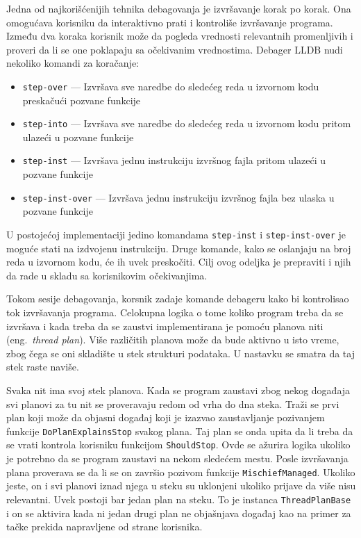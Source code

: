 \documentclass[12pt,oneside]{memoir}
\begin{document}
\label{sec:debugger_stepping}

Jedna od najkorišćenijih tehnika debagovanja je izvršavanje korak po korak.
Ona omogućava korisniku da interaktivno prati i kontroliše izvršavanje programa.
Između dva koraka korisnik može da pogleda vrednosti relevantnih promenljivih i proveri da li se one poklapaju sa očekivanim vrednostima.
Debager LLDB nudi nekoliko komandi za koračanje:
\begin{itemize}
  \item \verb|step-over| --- Izvršava sve naredbe do sledećeg reda u izvornom kodu preskačući pozvane funkcije
  \item \verb|step-into| --- Izvršava sve naredbe do sledećeg reda u izvornom kodu pritom ulazeći u pozvane funkcije
  \item \verb|step-inst| --- Izvršava jednu instrukciju izvršnog fajla pritom ulazeći u pozvane funkcije
  \item \verb|step-inst-over| --- Izvršava jednu instrukciju izvršnog fajla bez ulaska u pozvane funkcije
\end{itemize}
U postojećoj implementaciji jedino komandama \verb|step-inst| i \verb|step-inst-over| je moguće stati na izdvojenu instrukciju.
Druge komande, kako se oslanjaju na broj reda u izvornom kodu, će ih uvek preskočiti.
Cilj ovog odeljka je prepraviti i njih da rade u skladu sa korisnikovim očekivanjima.

Tokom sesije debagovanja, korsnik zadaje komande debageru kako bi kontrolisao tok izvršavanja programa.
Celokupna logika o tome koliko program treba da se izvršava i kada treba da se zaustvi implementirana je pomoću planova niti (eng.~{\em thread plan}).
Više različitih planova može da bude aktivno u isto vreme, zbog čega se oni skladište u stek strukturi podataka.
U nastavku se smatra da taj stek raste naviše.

Svaka nit ima svoj stek planova. %
Kada se program zaustavi zbog nekog događaja svi planovi za tu nit se proveravaju redom od vrha do dna steka.
Traži se prvi plan koji može da objasni događaj koji je izazvao zaustavljanje pozivanjem funkcije \verb|DoPlanExplainsStop| svakog plana.
Taj plan se onda upita da li treba da se vrati kontrola korisniku funkcijom \verb|ShouldStop|.
Ovde se ažurira logika ukoliko je potrebno da se program zaustavi na nekom sledećem mestu.
Posle izvršavanja plana proverava se da li se on završio pozivom funkcije \verb|MischiefManaged|.
Ukoliko jeste, on i svi planovi iznad njega u steku su uklonjeni ukoliko prijave da više nisu relevantni.
Uvek postoji bar jedan plan na steku.
To je instanca \verb|ThreadPlanBase| i on se aktivira kada ni jedan drugi plan ne objašnjava događaj kao na primer za tačke prekida napravljene od strane korisnika.
\end{document}
